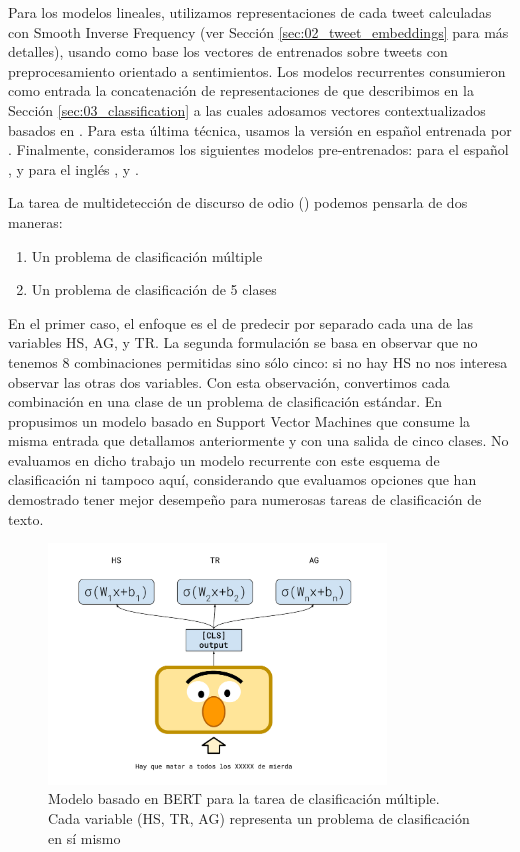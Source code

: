 Para los modelos lineales, utilizamos representaciones de cada tweet calculadas con Smooth Inverse Frequency (ver Sección \ref{sec:02_tweet_embeddings} para más detalles), usando como base los vectores de \fasttext{} entrenados sobre tweets con preprocesamiento orientado a sentimientos. Los modelos recurrentes consumieron como entrada la concatenación de representaciones de \fasttext{} que describimos en la Sección \ref{sec:03_classification} a las cuales adosamos vectores contextualizados basados en \elmo{}. \cite{peters2018} Para esta última técnica, usamos la versión en español entrenada por \citet{che-EtAl:2018:K18-2}. Finalmente, consideramos los siguientes modelos pre-entrenados: para el español \beto{} \cite{canete2020spanish}, y para el inglés \bert{} \cite{devlin2018bert}, \roberta{} \cite{liu2019roberta} y \bertweet{}. \cite{dat2020bertweet}

La tarea de multidetección de discurso de odio (\subtaskb{}) podemos pensarla de dos maneras:

\begin{enumerate}
    \item Un problema de clasificación múltiple
    \item Un problema de clasificación de 5 clases
\end{enumerate}

En el primer caso, el enfoque es el de predecir por separado cada una de las variables HS, AG, y TR. La segunda formulación se basa en observar que no tenemos 8 combinaciones permitidas sino sólo cinco: si no hay HS no nos interesa observar las otras dos variables. Con esta observación, convertimos cada combinación en una clase de un problema de clasificación estándar. En \citet{perez-2019-atalaya} propusimos un modelo basado en Support Vector Machines que consume la misma entrada que detallamos anteriormente y con una salida de cinco clases. No evaluamos en dicho trabajo un modelo recurrente con este esquema de clasificación ni tampoco aquí, considerando que evaluamos opciones que han demostrado tener mejor desempeño para numerosas tareas de clasificación de texto.

\begin{figure}
    \centering
    \includegraphics[width=0.8\textwidth]{img/05/bert_model_hateval.pdf}
    \caption{Modelo basado en BERT para la tarea de clasificación múltiple. Cada variable (HS, TR, AG) representa un problema de clasificación en sí mismo}
    \label{fig:bert_hateval_classifier}
\end{figure}


